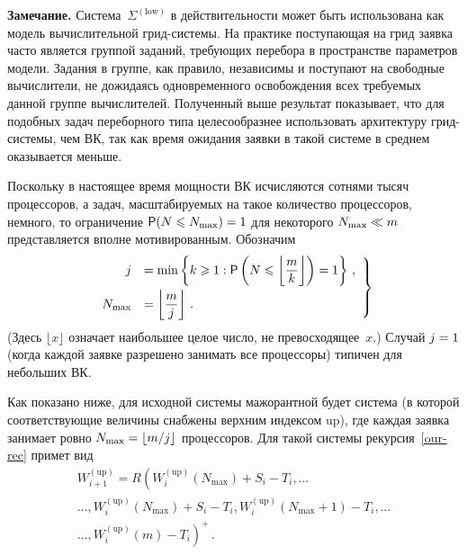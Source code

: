 \begin{multicols}{2}
\medskip

\noindent
\textbf{Замечание.}
Сис\-те\-ма~$\Sigma^{(\mathrm{low})}$ в действительности  может быть
использована как модель  вычислительной грид-сис\-те\-мы. На практике
поступающая  на грид заявка  часто является группой заданий,
требующих  перебора в пространстве параметров модели.
Задания в группе, как правило, независимы и поступают    на
свободные  вычислители, не дожидаясь одновременного освобождения
всех требуемых данной группе вычислителей. Полученный выше результат
показывает, что для подобных задач переборного типа целесообразнее
использовать архитектуру грид-сис\-те\-мы, чем ВК, так как время ожидания
заявки в такой системе в среднем оказывается меньше.

\smallskip

Поскольку в настоящее время  мощности ВК  исчисляются сотнями тысяч
процессоров, а  задач, масштабируемых на такое количество процессоров, немного, то
ограничение  $\p(N\leqslant N_{\max})\hm=1$ для некоторого $N_{\max}\hm\ll
m$ представляется вполне мотивированным. Обозначим
\begin{equation}
\left.
\begin{array}{rl}
    j&=\min\left\{ k\geqslant 1:
    {\sf P}\left(N\leqslant\left\lfloor\displaystyle\frac{\displaystyle m\mathstrut}{\displaystyle k\mathstrut}\right\rfloor\right)=1\right\}\,,\\[9pt]
    N_{\max}&=\left\lfloor\displaystyle\frac{\displaystyle m\mathstrut}{\displaystyle j\mathstrut}\right\rfloor\,.
    \end{array}
    \right\}
    \label{e8-mr}
\end{equation}
(Здесь $\lfloor x \rfloor$ означает наибольшее целое число, не превосходящее~$x$.)
Случай $j\hm=1$ (когда каждой заявке разрешено занимать все процессоры)
типичен для небольших ВК.

Как показано ниже, для исходной  системы мажорантной будет система
(в которой соответствующие величины снабжены  верхним индексом
up), где каждая заявка занимает ровно
$N_{\max}\hm=\lfloor{m}/{j}\rfloor$ процессоров. Для такой системы
рекурсия~\eqref{our-rec} примет вид
\begin{multline}
W^{(\mathrm{up})}_{i+1}= R\left(  W^{(\mathrm{up})}_{i}(N_{\max})+S_{i}-T_{i},\ldots\right.\\
\ldots ,W^{(\mathrm{up})}_{i}(N_{\max})+S_{i}-T_{i},
W^{(\mathrm{up})}_{i}(N_{\max}+1)-T_{i},\ldots\\
\left.\ldots,W^{(\mathrm{up})}_{i}(m)-T_{i}\right)^{+}\,.
\label{up-rec}
\end{multline}

\noindent


\end{multicols}

